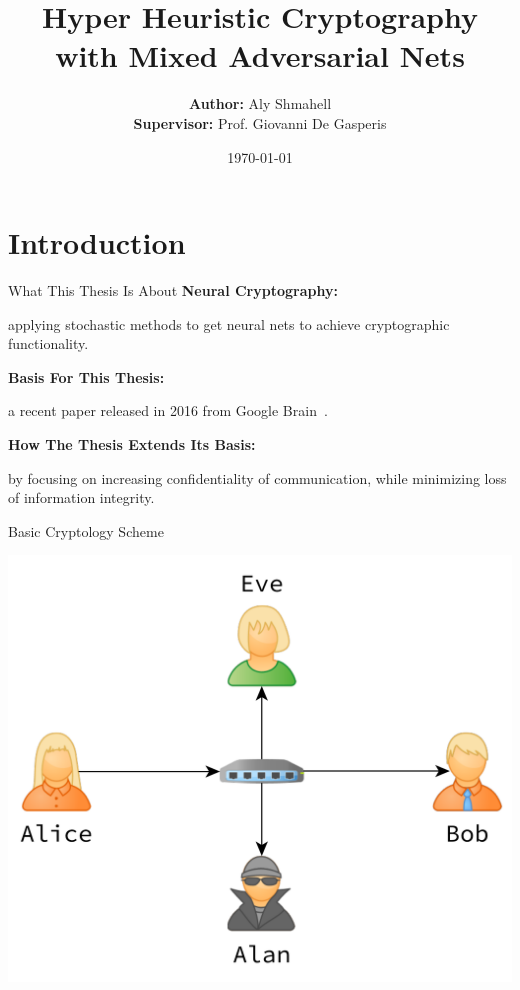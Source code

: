 \documentclass{beamer}
\title{Hyper Heuristic Cryptography with Mixed Adversarial Nets}
\date{\today}
\author{\textbf{Author:} Aly Shmahell \\ \textbf{Supervisor:} Prof. Giovanni De Gasperis}
\institute{University of L'Aquila}
\begin{document}
	\maketitle
	\section{Introduction}
		\begin{frame}{What This Thesis Is About}
			\vfill
			\textbf{Neural Cryptography:} \\\vfill
			\hfill\begin{minipage}{0.93\textwidth}
				applying stochastic methods to get neural nets to achieve cryptographic functionality.
				\end{minipage}
			\vfill
			\textbf{Basis For This Thesis:}\\\vfill
			\hfill\begin{minipage}{0.93\textwidth}
				a recent paper released in 2016 from Google Brain~\citep{DBLP:journals/corr/AbadiA16}.
			\end{minipage}
			\vfill
			\textbf{How The Thesis Extends Its Basis:}\\\vfill
			\hfill\begin{minipage}{0.93\textwidth}
				by focusing on increasing confidentiality of communication, while minimizing loss of information integrity.
			\end{minipage}
		\end{frame}
		\begin{frame}{Basic Cryptology Scheme}
			\vfill
			\begin{center}
				\includegraphics[height=0.8\textheight]{Alice-Bob-Eve-Alan}
			\end{center}
			\vfill
		\end{frame}
\end{document}
